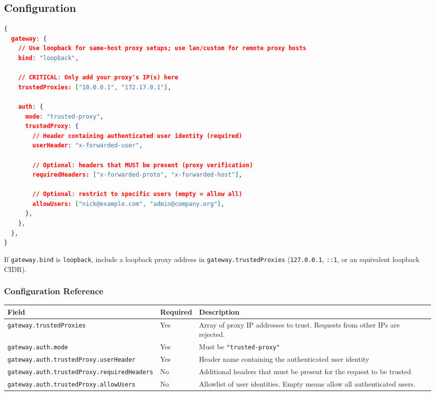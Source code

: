 \subsection{Configuration}


\begin{lstlisting}[language=json]
{
  gateway: {
    // Use loopback for same-host proxy setups; use lan/custom for remote proxy hosts
    bind: "loopback",

    // CRITICAL: Only add your proxy's IP(s) here
    trustedProxies: ["10.0.0.1", "172.17.0.1"],

    auth: {
      mode: "trusted-proxy",
      trustedProxy: {
        // Header containing authenticated user identity (required)
        userHeader: "x-forwarded-user",

        // Optional: headers that MUST be present (proxy verification)
        requiredHeaders: ["x-forwarded-proto", "x-forwarded-host"],

        // Optional: restrict to specific users (empty = allow all)
        allowUsers: ["nick@example.com", "admin@company.org"],
      },
    },
  },
}
\end{lstlisting}


If \texttt{gateway.bind} is \texttt{loopback}, include a loopback proxy address in
\texttt{gateway.trustedProxies} (\texttt{127.0.0.1}, \texttt{::1}, or an equivalent loopback CIDR).

\subsubsection{Configuration Reference}



\begin{table}[h]
\centering
\small
\begin{tabular}{|l|l|l|}
\hline
Field & Required & Description \\
\hline
\texttt{gateway.trustedProxies} & Yes & Array of proxy IP addresses to trust. Requests from other IPs are rejected. \\
\hline
\texttt{gateway.auth.mode} & Yes & Must be \texttt{"trusted-proxy"} \\
\hline
\texttt{gateway.auth.trustedProxy.userHeader} & Yes & Header name containing the authenticated user identity \\
\hline
\texttt{gateway.auth.trustedProxy.requiredHeaders} & No & Additional headers that must be present for the request to be trusted \\
\hline
\texttt{gateway.auth.trustedProxy.allowUsers} & No & Allowlist of user identities. Empty means allow all authenticated users. \\
\hline
\end{tabular}
\end{table}



